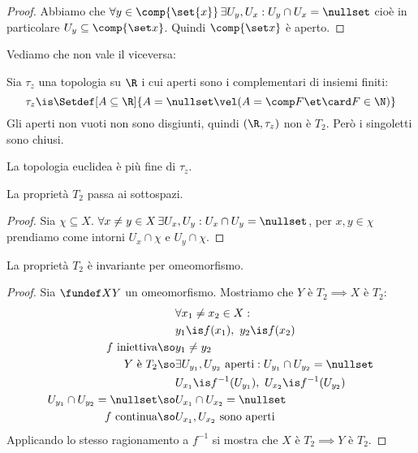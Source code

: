 \begin{proof}
	Abbiamo che $\forall y\in\comp{\set{x}}\,\exists U_y,U_x:U_y\cap U_x=\nullset$
	cioè in particolare $U_y\subseteq\comp{\set x}$.
	Quindi $\comp{\set x}$ è aperto.
\end{proof}

Vediamo che non vale il viceversa:

\begin{es}
	Sia $\tau_z$ una topologia su $\R$ i cui aperti sono i complementari di insiemi finiti:
	\[\tau_z\is\Setdef[A\subseteq\R]{A=\nullset\vel(A=\comp F\et\card F\in\N)}\]
	Gli aperti non vuoti non sono disgiunti, quindi $(\R,\tau_z)$ non è $T_2$.
	Però i singoletti sono chiusi.
\end{es}

\begin{oss}
La topologia euclidea è più fine di $\tau_z$.
\end{oss}

\begin{prop}
	La proprietà $T_2$ passa ai sottospazi.
\end{prop}

\begin{proof}
	Sia $\chi\subseteq X$.
	$\forall x\neq y\in X\,\exists U_x,U_y:U_x\cap U_y=\nullset$,
	per $x,y\in\chi$ prendiamo come intorni $U_x\cap\chi$ e $U_y\cap\chi$.
\end{proof}

\begin{prop}
	La proprietà $T_2$ è invariante per omeomorfismo.
\end{prop}

\begin{proof}
	Sia $\fundef XY$ un omeomorfismo. Mostriamo che $Y\text{ è }T_2\implies X\text{ è }T_2$:
	\begin{align*}
		&\forall x_1\neq x_2\in X:\\
		&y_1\is f(x_1),\ y_2\is f(x_2)\\
		f\text{ iniettiva}\so&y_1\neq y_2\\
		Y\text{ è }T_2\so&\exists U_{y_1},U_{y_2}\text{ aperti}:U_{y_1}\cap U_{y_2}=\nullset\\
		&U_{x_1}\is f^{-1}(U_{y_1}),\ U_{x_2}\is f^{-1}(U_{y_2})\\
		U_{y_1}\cap U_{y_2}=\nullset\so&U_{x_1}\cap U_{x_2}=\nullset\\
		f\text{ continua}\so&U_{x_1}, U_{x_2}\text{ sono aperti}
	\end{align*}
	Applicando lo stesso ragionamento a $f^{-1}$ si mostra che $X\text{ è }T_2\implies Y\text{ è }T_2$.
\end{proof}

